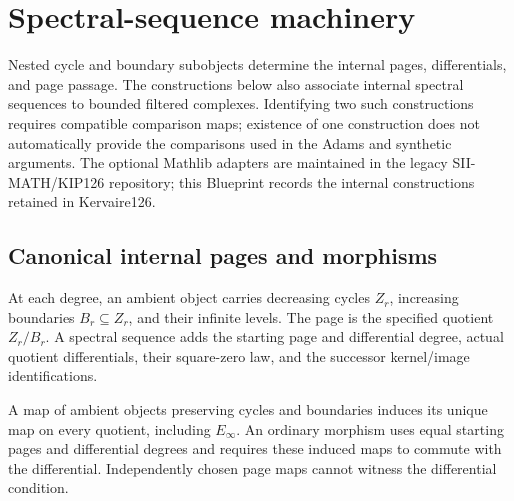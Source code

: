\section{Spectral-sequence machinery}
\label{chap:spectral-sequence-machinery}

Nested cycle and boundary subobjects determine the internal pages,
differentials, and page passage. The constructions below also associate
internal spectral sequences to bounded filtered complexes. Identifying
two such constructions requires compatible comparison maps; existence of
one construction does not automatically provide the comparisons used in
the Adams and synthetic arguments. The optional Mathlib adapters are
maintained in the legacy SII-MATH/KIP126 repository; this Blueprint records
the internal constructions retained in Kervaire126.

\subsection{Canonical internal pages and morphisms}

\begin{definition}
  \label{def:internal-nested-spectral-sequence}
  \leanok
  At each degree, an ambient object carries decreasing cycles $Z_r$,
  increasing boundaries $B_r\subseteq Z_r$, and their infinite levels.
  The page is the specified quotient $Z_r/B_r$. A spectral sequence adds
  the starting page and differential degree, actual quotient differentials,
  their square-zero law, and the successor kernel/image identifications.
\end{definition}

\begin{definition}
  \label{def:internal-canonical-page-map}
  \leanok
  A map of ambient objects preserving cycles and boundaries induces its
  unique map on every quotient, including $E_\infty$. An ordinary morphism
  uses equal starting pages and differential degrees and requires these
  induced maps to commute with the differential. Independently chosen page
  maps cannot witness the differential condition.
\end{definition}

